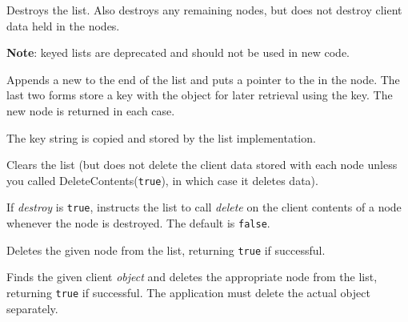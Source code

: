 \label{wxlistdtor}


Destroys the list.  Also destroys any remaining nodes, but does not destroy
client data held in the nodes.

\label{wxlistappend}


{\bf Note}: keyed lists are deprecated and should not be used in new code.



Appends a new  to the end of the list and puts a
pointer to the  in the node.  The last two forms store a key
with the object for later retrieval using the key. The new node is returned in
each case.

The key string is copied and stored by the list implementation.

\label{wxlistclear}


Clears the list (but does not delete the client data stored with each node
unless you called DeleteContents({\tt true}), in which case it deletes data).

\label{wxlistdeletecontents}


If {\it destroy} is {\tt true}, instructs the list to call {\it delete} on the client contents of
a node whenever the node is destroyed. The default is {\tt false}.

\label{wxlistdeletenode}


Deletes the given node from the list, returning {\tt true} if successful.

\label{wxlistdeleteobject}


Finds the given client {\it object} and deletes the appropriate node from the list, returning
{\tt true} if successful. The application must delete the actual object separately.

